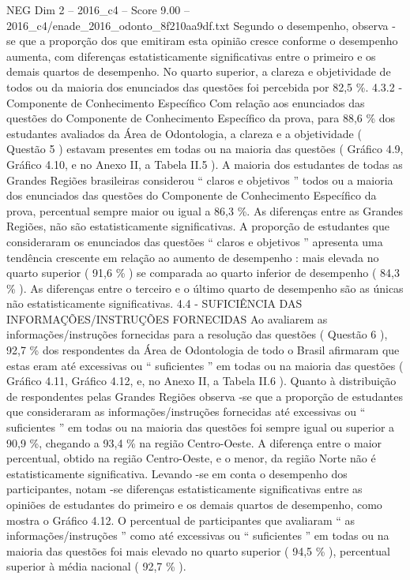 \begin{textsample}{NEG Dim 2 – 2016\_c4 – Score 9.00 – 2016\_c4/enade\_2016\_odonto\_8f210aa9df.txt}
Segundo o desempenho, observa -se que a proporção dos que emitiram esta opinião cresce conforme o desempenho aumenta, com diferenças estatisticamente significativas entre o primeiro e os demais quartos de desempenho.
No quarto superior, a clareza e objetividade de todos ou da maioria dos enunciados das questões foi percebida por 82,5 \%. 4.3.2 - Componente de Conhecimento Específico Com relação aos enunciados das questões do Componente de Conhecimento Específico da prova, para 88,6 \% dos estudantes avaliados da Área de Odontologia, a clareza e a objetividade ( Questão 5 ) estavam presentes em todas ou na maioria das questões ( Gráfico 4.9, Gráfico 4.10, e no Anexo II, a Tabela II.5 ).
A maioria dos estudantes de todas as Grandes Regiões brasileiras considerou “ claros e objetivos ” todos ou a maioria dos enunciados das questões do Componente de Conhecimento Específico da prova, percentual sempre maior ou igual a 86,3 \%.
As diferenças entre as Grandes Regiões, não são estatisticamente significativas.
A proporção de estudantes que consideraram os enunciados das questões “ claros e objetivos ” apresenta uma tendência crescente em relação ao aumento de desempenho : mais elevada no quarto superior ( 91,6 \% ) se comparada ao quarto inferior de desempenho ( 84,3 \% ).
As diferenças entre o terceiro e o último quarto de desempenho são as únicas não estatisticamente significativas. 4.4 - SUFICIÊNCIA DAS INFORMAÇÕES/INSTRUÇÕES FORNECIDAS Ao avaliarem as informações/instruções fornecidas para a resolução das questões ( Questão 6 ), 92,7 \% dos respondentes da Área de Odontologia de todo o Brasil afirmaram que estas eram até excessivas ou “ suficientes ” em todas ou na maioria das questões ( Gráfico 4.11, Gráfico 4.12, e, no Anexo II, a Tabela II.6 ).
Quanto à distribuição de respondentes pelas Grandes Regiões observa -se que a proporção de estudantes que consideraram as informações/instruções fornecidas até excessivas ou “ suficientes ” em todas ou na maioria das questões foi sempre igual ou superior a 90,9 \%, chegando a 93,4 \% na região Centro-Oeste.
A diferença entre o maior percentual, obtido na região Centro-Oeste, e o menor, da região Norte não é estatisticamente significativa.
Levando -se em conta o desempenho dos participantes, notam -se diferenças estatisticamente significativas entre as opiniões de estudantes do primeiro e os demais quartos de desempenho, como mostra o Gráfico 4.12.
O percentual de participantes que avaliaram “ as informações/instruções ” como até excessivas ou “ suficientes ” em todas ou na maioria das questões foi mais elevado no quarto superior ( 94,5 \% ), percentual superior à média nacional ( 92,7 \% ).

\end{textsample}
